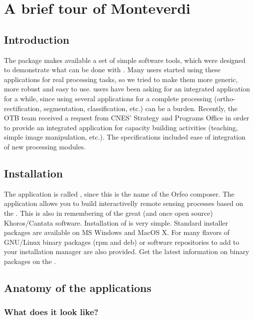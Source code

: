 \chapter{A brief tour of Monteverdi}\label{chap:Monteverdi} 

\section{Introduction}\label{sec:montintro}
The \app package makes available a set of simple software
tools, which were designed to demonstrate what can be done with
\otb. Many users started using these applications for real processing
tasks, so we tried to make them more generic, more robust and easy to
use. \otb users have been asking for an integrated application for a
while, since using several applications for a complete processing
(ortho-rectification, segmentation, classification, etc.) can be a
burden. Recently, the OTB team received a request from CNES' Strategy
and Programs Office in order to provide an integrated application for
capacity building activities (teaching, simple image manipulation,
etc.). The specifications included ease of integration of new
processing modules.  

\section{Installation}\label{sec:montinstall} 
The application is called \mont, since this is the name of the Orfeo
composer. The application allows you to build interactivelly remote
sensing processes based on the \otb. This is also in
remembering of the great (and once open source) Khoros/Cantata
software.  Installation of \mont is very simple. Standard
installer packages are available on MS Windows and MacOS X.  For many
flavors of GNU/Linux binary packages (rpm and deb) or software
repositories to add to your installation manager are also provided. 
Get the latest information on binary packages on the \website.

\section{Anatomy of the applications}\label{sec:anatomy}

\subsection{What does it look like?}

